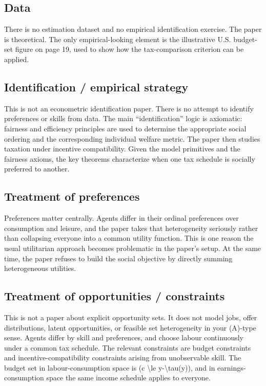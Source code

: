 \documentclass[11pt,a4paper]{article}
\begin{document}
\subsection*{Data}
There is no estimation dataset and no empirical identification exercise. The paper is theoretical. The only empirical-looking element is the illustrative U.S. budget-set figure on page 19, used to show how the tax-comparison criterion can be applied.

\subsection*{Identification / empirical strategy}
This is not an econometric identification paper. There is no attempt to identify preferences or skills from data. The main “identification” logic is axiomatic: fairness and efficiency principles are used to determine the appropriate social ordering and the corresponding individual welfare metric. The paper then studies taxation under incentive compatibility. Given the model primitives and the fairness axioms, the key theorems characterize when one tax schedule is socially preferred to another.

\subsection*{Treatment of preferences}
Preferences matter centrally. Agents differ in their ordinal preferences over consumption and leisure, and the paper takes that heterogeneity seriously rather than collapsing everyone into a common utility function. This is one reason the usual utilitarian approach becomes problematic in the paper’s setup. At the same time, the paper refuses to build the social objective by directly summing heterogeneous utilities.

\subsection*{Treatment of opportunities / constraints}
This is not a paper about explicit opportunity sets. It does not model jobs, offer distributions, latent opportunities, or feasible set heterogeneity in your (A)-type sense. Agents differ by skill and preferences, and choose labour continuously under a common tax schedule. The relevant constraints are budget constraints and incentive-compatibility constraints arising from unobservable skill. The budget set in labour-consumption space is (c \textbackslash{}le y-\textbackslash{}tau(y)), and in earnings-consumption space the same income schedule applies to everyone.
\end{document}
